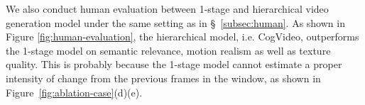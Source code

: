 We also conduct human evaluation between 1-stage and hierarchical video generation model under the same setting as in \S~\ref{subsec:human}. As shown in Figure \ref{fig:human-evaluation}, the hierarchical model, i.e. CogVideo, outperforms the 1-stage model on semantic relevance, motion realism as well as texture quality. 
This is probably because the 1-stage model cannot estimate a proper intensity of change from the previous frames in the window, as shown in Figure~\ref{fig:ablation-case}(d)(e). 




